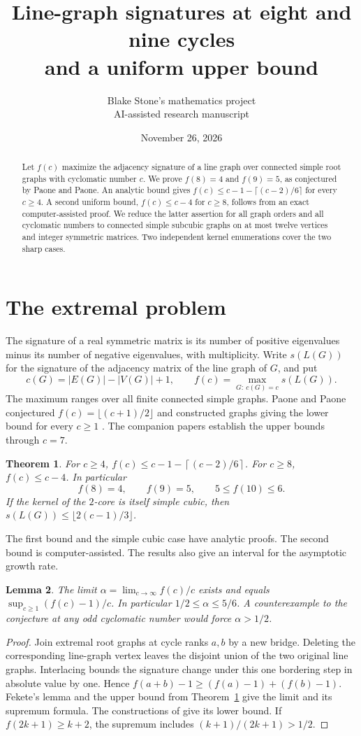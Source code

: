 \documentclass[11pt]{article}
\title{Line-graph signatures at eight and nine cycles\\and a uniform upper bound}
\author{Blake Stone's mathematics project\\\small AI-assisted research manuscript}
\date{November 26, 2026}
\newtheorem{theorem}{Theorem}[section]
\newtheorem{lemma}[theorem]{Lemma}
\newcommand{\ceil}[1]{\left\lceil#1\right\rceil}
\begin{document}
\maketitle
\begin{abstract}
Let $f(c)$ maximize the adjacency signature of a line graph over connected simple root graphs with cyclomatic number $c$. We prove $f(8)=4$ and $f(9)=5$, as conjectured by Paone and Paone. An analytic bound gives $f(c)\le c-1-\lceil(c-2)/6\rceil$ for every $c\ge4$. A second uniform bound, $f(c)\le c-4$ for $c\ge8$, follows from an exact computer-assisted proof. We reduce the latter assertion for all graph orders and all cyclomatic numbers to connected simple subcubic graphs on at most twelve vertices and integer symmetric matrices. Two independent kernel enumerations cover the two sharp cases.
\end{abstract}

\section{The extremal problem}
The signature of a real symmetric matrix is its number of positive eigenvalues minus its number of negative eigenvalues, with multiplicity. Write $s(L(G))$ for the signature of the adjacency matrix of the line graph of $G$, and put
\[
 c(G)=|E(G)|-|V(G)|+1,\qquad f(c)=\max_{G:\ c(G)=c}s(L(G)).
\]
The maximum ranges over all finite connected simple graphs. Paone and Paone conjectured $f(c)=\lfloor(c+1)/2\rfloor$ and constructed graphs giving the lower bound for every $c\ge1$ \cite[Theorem 5.3 and Conjecture 5.4]{PP}. The companion papers \cite{small,finite} establish the upper bounds through $c=7$.
\begin{theorem}\label{th:main}
For $c\ge4$, $f(c)\le c-1-\ceil{(c-2)/6}$. For $c\ge8$, $f(c)\le c-4$. In particular
\[
 f(8)=4,\qquad f(9)=5,\qquad 5\le f(10)\le6.
\]
If the kernel of the $2$-core is itself simple cubic, then $s(L(G))\le\lfloor 2(c-1)/3\rfloor$.
\end{theorem}
The first bound and the simple cubic case have analytic proofs. The second bound is computer-assisted. The results also give an interval for the asymptotic growth rate.
\begin{lemma}
The limit $\alpha=\lim_{c\to\infty}f(c)/c$ exists and equals $\sup_{c\ge1}(f(c)-1)/c$. In particular $1/2\le\alpha\le5/6$. A counterexample to the conjecture at any odd cyclomatic number would force $\alpha>1/2$.
\end{lemma}
\begin{proof}
Join extremal root graphs at cycle ranks $a,b$ by a new bridge. Deleting the corresponding line-graph vertex leaves the disjoint union of the two original line graphs. Interlacing bounds the signature change under this one bordering step in absolute value by one. Hence $f(a+b)-1\ge(f(a)-1)+(f(b)-1)$. Fekete's lemma and the upper bound from Theorem~\ref{th:main} give the limit and its supremum formula. The constructions of \cite{PP} give its lower bound. If $f(2k+1)\ge k+2$, the supremum includes $(k+1)/(2k+1)>1/2$.
\end{proof}
\end{document}
